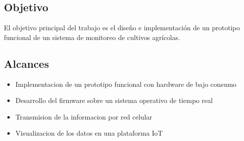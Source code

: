 \subsection{Objetivo}
El objetivo principal del trabajo es el diseño e implementación de un prototipo funcional de un sistema de monitoreo de cultivos agrícolas.
\subsection{Alcances}

\begin{itemize}
  \item Implementacion de un prototipo funcional con hardware de bajo consumo 	
  \item Desarrollo del firmware sobre un sistema operativo de tiempo real
  \item Transmision de la informacion por red celular 
  \item Visualizacion de los datos en una plataforma IoT
\end{itemize}
